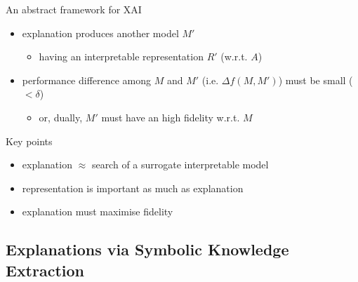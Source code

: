 \documentclass[presentation]{beamer}\mode<presentation>{\usetheme{AMSBolognaFC}}
\begin{document}
\begin{frame}[allowframebreaks]{An abstract framework for XAI}
\begin{itemize}
        \item explanation produces another model $M'$
        \begin{itemize}
            \item having an interpretable \alert{representation} $R'$ (w.r.t. $A$)
        \end{itemize}

        \item performance difference among $M$ and $M'$ (i.e. $\Delta f(M, M')$) must be small ($< \delta$)
        \begin{itemize}
            \item or, dually, $M'$ must have an high \alert{fidelity} w.r.t. $M$
        \end{itemize}
    \end{itemize}

    \begin{block}{Key points}
        \begin{itemize}
            \item explanation $\approx$ search of a \alert{surrogate} interpretable model
            \item \alert{representation} is important as much as explanation
            \item explanation must maximise \alert{fidelity}
        \end{itemize}
    \end{block}

\end{frame}

\subsection{Explanations via Symbolic Knowledge Extraction}
\end{document}
